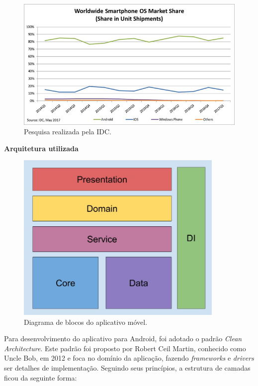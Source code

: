 \documentclass[
	12pt,				%
	oneside,			%
	a4paper,			%
	brazil				%
]{abntex2}
\begin{document}
{\begin{figure}[H]
\centering
\includegraphics[width=15cm, center]{images/smartphone-share-market.jpg}
\caption{Pesquisa realizada pela IDC.}
\label{Rotulo}
\end{figure}

\newpage

\textbf{Arquitetura utilizada}

\begin{figure}[H]
\centering
\includegraphics[width=10cm, center]{images/brick_diagram_beacon}
\caption{Diagrama de blocos do aplicativo móvel.}
\label{Rotulo}
\end{figure}

Para desenvolvimento do aplicativo para Android, foi adotado o padrão \textit{Clean Architecture}. Este padrão foi proposto por Robert Ceil Martin, conhecido como Uncle Bob, em 2012 e foca no domínio da aplicação, fazendo \textit{frameworks} e \textit{drivers} ser detalhes de implementação. Seguindo seus princípios, a estrutura de camadas ficou da seguinte forma:

}
\end{document}
